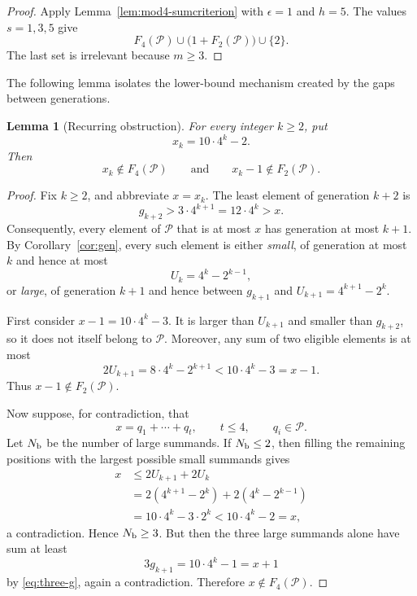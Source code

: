 \documentclass[11pt]{article}
\theoremstyle{plain}
\newtheorem{lemma}[theorem]{Lemma}
\theoremstyle{definition}
\newcommand{\Pset}{\mathcal P}
\begin{document}
\begin{proof}
Apply Lemma~\ref{lem:mod4-sumcriterion} with $\epsilon=1$ and $h=5$.
The values $s=1,3,5$ give
\[
 F_4(\Pset)\cup\bigl(1+F_2(\Pset)\bigr)\cup\{2\}.
\]
The last set is irrelevant because $m\geq3$.
\end{proof}

The following lemma isolates the lower-bound mechanism created by the
gaps between generations.

\begin{lemma}[Recurring obstruction]\label{lem:obstruction}
For every integer $k\geq2$, put
\[
 x_k=10\cdot4^k-2.
\]
Then
\begin{equation}\label{eq:obstruction}
 x_k\notin F_4(\Pset)
 \qquad\text{and}\qquad
 x_k-1\notin F_2(\Pset).
\end{equation}
\end{lemma}

\begin{proof}
Fix $k\geq2$, and abbreviate $x=x_k$.  The least element of generation
$k+2$ is
\[
 g_{k+2}>3\cdot4^{k+1}=12\cdot4^k>x.
\]
Consequently, every element of $\Pset$ that is at most $x$ has generation
at most $k+1$.  By Corollary~\ref{cor:gen}, every such element is either
\emph{small}, of generation at most $k$ and hence at most
\[
 U_k=4^k-2^{k-1},
\]
or \emph{large}, of generation $k+1$ and hence between $g_{k+1}$ and
$U_{k+1}=4^{k+1}-2^k$.

First consider $x-1=10\cdot4^k-3$.  It is larger than $U_{k+1}$ and
smaller than $g_{k+2}$, so it does not itself belong to $\Pset$.
Moreover, any sum of two eligible elements is at most
\[
 2U_{k+1}=8\cdot4^k-2^{k+1}<10\cdot4^k-3=x-1.
\]
Thus $x-1\notin F_2(\Pset)$.

Now suppose, for contradiction, that
\[
 x=q_1+\cdots+q_t,
 \qquad t\leq4,
 \qquad q_i\in\Pset.
\]
Let $N_{\rm b}$ be the number of large summands.  If $N_{\rm b}\leq2$,
then filling the remaining positions with the largest possible small
summands gives
\begin{align*}
 x
 &\leq2U_{k+1}+2U_k\\
 &=2(4^{k+1}-2^k)+2(4^k-2^{k-1})\\
 &=10\cdot4^k-3\cdot2^k
 <10\cdot4^k-2=x,
\end{align*}
a contradiction.  Hence $N_{\rm b}\geq3$.  But then the three large
summands alone have sum at least
\[
 3g_{k+1}=10\cdot4^k-1=x+1
\]
by \eqref{eq:three-g}, again a contradiction.  Therefore
$x\notin F_4(\Pset)$.
\end{proof}
\end{document}
